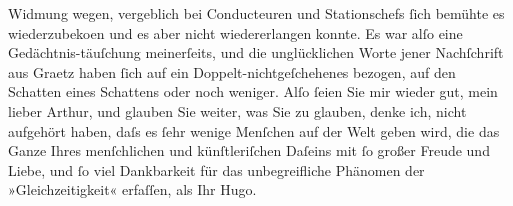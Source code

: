 \begin{ledgroupsized}[t]{13cm}
               Widmung wegen, vergeblich bei Conducteuren und Stationschefs ſich bemühte es
                  wiederzubeko{\geminationm}en und es aber nicht wiedererlangen
               konnte.\pend
           \pstart
           Es war alſo eine Gedächtnis-täuſchung {\pb}meinerſeits, und die unglücklichen
               Worte jener Nachſchrift aus Graetz haben ſich auf
               ein Doppelt-nichtgeſchehenes bezogen, auf den Schatten eines Schattens oder noch
               weniger.\pend
           \pstart
           Alſo ſeien Sie mir wieder gut, mein lieber Arthur, und glauben Sie weiter, was Sie
                  {\pb}zu glauben, denke ich, nicht
               aufgehört haben, daſs es ſehr wenige Menſchen auf der Welt geben wird, die das Ganze
               Ihres menſchlichen und künſtleriſchen Daſeins mit ſo großer Freude und Liebe, und ſo
               viel Dankbarkeit für das unbegreifliche Phänomen der »Gleichzeitigkeit« erfaſſen, als
               Ihr\pend
           \pstart \spacefill\mbox{Hugo.}\pend{}\endnumbering{}\end{ledgroupsized}  \newcommand{\dateiname}{L01978}\newcommand{\titel}{Hugo von Hofmannsthal an Arthur Schnitzler, 7. 11. 1910}\newcommand{\editorInnen}{Martin Anton Müller und Gerd-Hermann Susen}
      